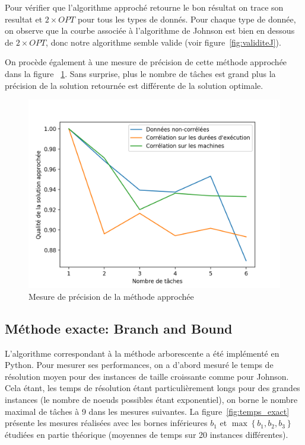 \documentclass[a4paper, 10pt]{article}
\begin{document}
		Pour vérifier que l'algorithme approché retourne le bon résultat on trace son resultat et $2 \times OPT$ pour tous les types de donnés. Pour chaque type de donnée, on observe que la courbe associée à l'algorithme de Johnson est bien en dessous de $2 \times OPT$, donc notre algorithme semble valide (voir figure~\ref{fig:validiteJ}).
		
		On procède également à une mesure de précision de cette méthode approchée dans la figure ~\ref{fig:accuracy}. Sans surprise, plus le nombre de tâches est grand plus la précision de la solution retournée est différente de la solution optimale.
		
		\begin{figure}[h]
			\centering
			\includegraphics[width=0.75\linewidth]{graphes/accuracy_app_exa.png}
			\caption{Mesure de précision de la méthode approchée}
			\label{fig:accuracy}
		\end{figure}
		
		\subsection*{Méthode exacte: Branch and Bound}
		
	L'algorithme correspondant à la méthode arborescente a été implémenté en Python. Pour mesurer ses performances, on a d'abord mesuré le temps de résolution moyen pour des instances de taille croissante comme pour Johnson. Cela étant, les temps de résolution étant particulièrement longs pour des grandes instances (le nombre de noeuds possibles étant exponentiel), on borne le nombre maximal de tâches à 9 dans les mesures suivantes. La figure~\ref{fig:temps_exact} présente les mesures réalisées avec les bornes inférieures $b_1$ et $\max\left\{ b_1, b_2, b_3 \right\}$ étudiées en partie théorique (moyennes de temps sur 20 instances différentes).
		
\end{document}
